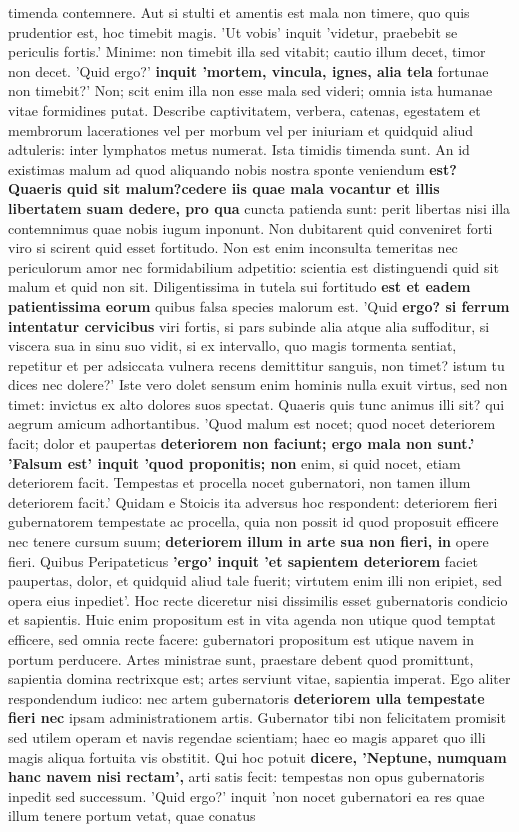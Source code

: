 timenda contemnere. Aut si stulti et amentis est mala non timere, quo quis prudentior est, hoc timebit magis. 'Ut vobis' inquit 'videtur, praebebit se periculis fortis.' Minime: non timebit illa sed vitabit; cautio illum decet, timor non decet. 'Quid ergo?' \textbf{inquit 'mortem, vincula, ignes, alia tela} fortunae non timebit?' Non; scit enim illa non esse mala sed videri; omnia ista humanae vitae formidines putat. Describe captivitatem, verbera, catenas, egestatem et membrorum lacerationes vel per morbum vel per iniuriam et quidquid aliud adtuleris: inter lymphatos metus numerat. Ista timidis timenda sunt. An id existimas malum ad quod aliquando nobis nostra sponte veniendum \textbf{est? Quaeris \textbf{quid \textbf{sit \textbf{malum?cedere iis quae} mala vocantur}} et \textbf{illis} libertatem suam dedere, pro qua} cuncta patienda sunt: perit libertas nisi illa contemnimus quae nobis iugum inponunt. Non dubitarent quid conveniret forti viro si scirent quid esset fortitudo. Non est enim inconsulta temeritas nec periculorum amor nec formidabilium adpetitio: scientia est distinguendi quid sit malum et quid non sit. Diligentissima in tutela sui fortitudo \textbf{est et eadem patientissima eorum} quibus falsa species malorum est. 'Quid \textbf{ergo? si ferrum intentatur cervicibus} viri fortis, si pars subinde alia atque alia suffoditur, si viscera sua in sinu suo vidit, si ex intervallo, quo magis tormenta sentiat, repetitur et per adsiccata vulnera recens demittitur sanguis, non timet? istum tu dices nec dolere?' Iste vero dolet sensum enim hominis nulla exuit virtus, sed non timet: invictus ex alto dolores suos spectat. Quaeris quis tunc animus illi sit? qui aegrum amicum adhortantibus. 'Quod malum est nocet; quod nocet deteriorem facit; dolor et paupertas \textbf{deteriorem non faciunt; ergo mala \textbf{non sunt.'} 'Falsum est' inquit 'quod proponitis; non} enim, si quid nocet, etiam deteriorem facit. Tempestas et procella nocet gubernatori, non tamen illum deteriorem facit.' Quidam e Stoicis ita adversus hoc respondent: deteriorem fieri gubernatorem tempestate ac procella, quia non possit id quod proposuit efficere nec tenere cursum suum; \textbf{deteriorem illum in arte sua non fieri, in} opere fieri. Quibus Peripateticus \textbf{'ergo' inquit 'et sapientem deteriorem} faciet paupertas, dolor, et quidquid aliud tale fuerit; virtutem enim illi non eripiet, sed opera eius inpediet'. Hoc recte diceretur nisi dissimilis esset gubernatoris condicio et sapientis. Huic enim propositum est in vita agenda non utique quod temptat efficere, sed omnia recte facere: gubernatori propositum est utique navem in portum perducere. Artes ministrae sunt, praestare debent quod promittunt, sapientia domina rectrixque est; artes serviunt vitae, sapientia imperat. Ego aliter respondendum iudico: nec artem gubernatoris \textbf{\textbf{deteriorem ulla tempestate fieri} nec} ipsam administrationem artis. Gubernator tibi non felicitatem promisit sed utilem operam et navis regendae scientiam; haec eo magis apparet quo illi magis aliqua fortuita vis obstitit. Qui hoc potuit \textbf{dicere, 'Neptune, numquam hanc navem nisi rectam',} arti satis fecit: tempestas non opus gubernatoris inpedit sed successum. 'Quid ergo?' inquit 'non nocet gubernatori ea res quae illum tenere portum vetat, quae conatus 